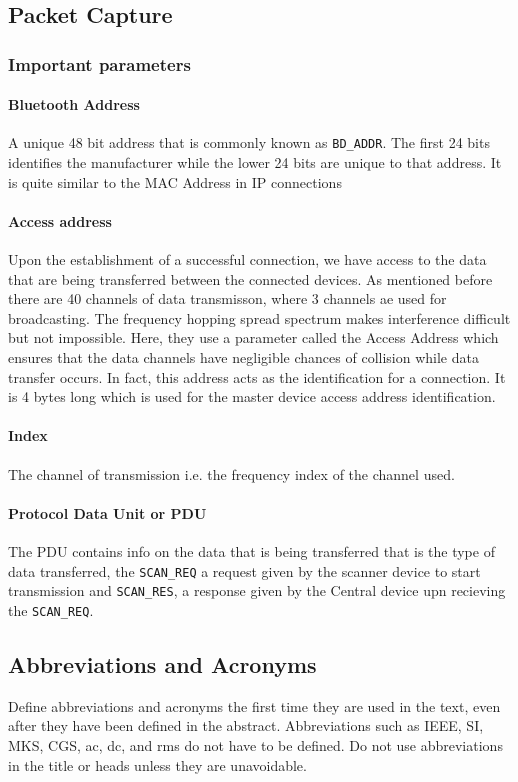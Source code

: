 \documentclass[conference]{IEEEtran}
\begin{document}
\subsection{Packet Capture}
\subsubsection{Important parameters}

\paragraph{Bluetooth Address}
A unique 48 bit address that is commonly known as \verb|BD_ADDR|. The first 24 bits identifies the manufacturer while the lower 24 bits are unique to that address. It is quite similar to the MAC Address in IP connections

\paragraph{\textbf{Access address}}
Upon the establishment of a successful connection, we have access to the data that are being transferred between the connected devices. As mentioned before there are 40 channels of data transmisson, where 3 channels ae used for broadcasting. The frequency hopping spread spectrum makes interference difficult but not impossible. Here, they use a parameter called the Access Address which ensures that the data channels have negligible chances of collision  while data transfer occurs. In fact, this address acts as the identification for a connection. It is 4 bytes long which is used for the master device access address identification. 

\paragraph{\textbf{Index}}
The channel of transmission i.e. the frequency index of the channel used.

\paragraph{\textbf{Protocol Data Unit or PDU}}
The PDU contains info on the data that is being transferred that is the type of data transferred, the \verb|SCAN_REQ| a request given by the scanner device to start transmission and \verb|SCAN_RES|, a response given by the Central device upn recieving the \verb|SCAN_REQ|.

\subsection{Abbreviations and Acronyms}\label{AA}
Define abbreviations and acronyms the first time they are used in the text, 
even after they have been defined in the abstract. Abbreviations such as 
IEEE, SI, MKS, CGS, ac, dc, and rms do not have to be defined. Do not use 
abbreviations in the title or heads unless they are unavoidable.
\end{document}
